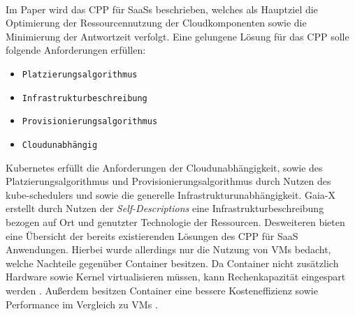 \paragraph{}
Im Paper \cite{Bousselmi2014} wird das \ac{CPP} für \acp{SaaS} beschrieben, welches als Hauptziel die Optimierung der Ressourcennutzung
der Cloudkomponenten sowie die Minimierung der Antwortzeit verfolgt.
Eine gelungene Lösung für das \ac{CPP} solle folgende Anforderungen erfüllen:
\begin{itemize}
  \item \texttt{Platzierungsalgorithmus}
  \item \texttt{Infrastrukturbeschreibung}
  \item \texttt{Provisionierungsalgorithmus}
  \item \texttt{Cloudunabhängig}
\end{itemize}
Kubernetes erfüllt die Anforderungen der Cloudunabhängigkeit, sowie des Platzierungsalgorithmus und Provisionierungsalgorithmus
durch Nutzen des kube-schedulers und sowie die generelle Infrastrukturunabhängigkeit. 
Gaia-X erstellt durch Nutzen der \emph{Self-Descriptions} eine Infrastrukturbeschreibung bezogen auf Ort und genutzter Technologie der Ressourcen.
Desweiteren bieten \citeauthor{Bousselmi2014} eine Übersicht der bereits existierenden Lösungen des \ac{CPP} für \ac{SaaS} Anwendungen.
Hierbei wurde allerdings nur die Nutzung von \acfp{VM} bedacht, welche Nachteile gegenüber Container besitzen.
Da Container nicht zusätzlich Hardware sowie Kernel virtualisieren müssen, kann Rechenkapazität eingespart werden \cite{seo2014performance}.
Außerdem besitzen Container eine bessere Kosteneffizienz sowie Performance im Vergleich zu \acp{VM} \cite{soltesz2007container}.
